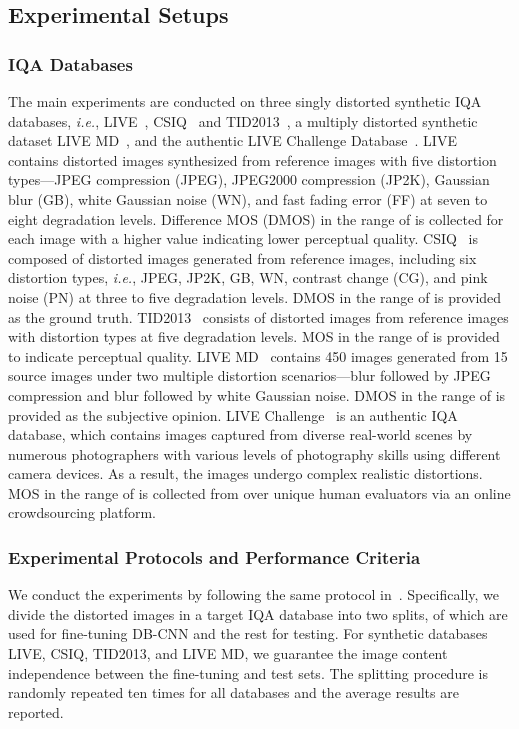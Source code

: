 \documentclass[journal]{IEEEtran}
\begin{document}
\subsection{Experimental Setups}\label{subsec:expsetup}
\subsubsection{IQA Databases}\label{subsec:IQAdatabase}
The main experiments are conducted on three singly distorted synthetic IQA databases, \textit{i.e.}, LIVE~\cite{sheikh2006statistical}, CSIQ~\cite{larson2010most} and TID2013~\cite{ponomarenko2013color}, a multiply distorted synthetic dataset LIVE MD~\cite{Jayaraman2013Objective}, and the authentic LIVE Challenge Database~\cite{ghadiyaram2016massive}. LIVE~\cite{sheikh2006statistical} contains  distorted images synthesized from  reference images with five distortion types---JPEG compression (JPEG), JPEG2000 compression (JP2K), Gaussian blur (GB), white Gaussian noise (WN), and fast fading error (FF) at seven to eight degradation levels. Difference MOS (DMOS) in the range of  is collected for each image with a higher value indicating lower perceptual quality. CSIQ~\cite{larson2010most}  is composed of  distorted images generated from  reference images, including six distortion types, \textit{i.e.}, JPEG, JP2K, GB, WN, contrast change (CG), and pink noise (PN) at three to five degradation levels. DMOS in the range of  is provided as the ground truth. TID2013~\cite{ponomarenko2013color} consists of  distorted images from  reference images with  distortion types at five degradation levels. MOS in the range of  is provided to indicate perceptual quality. LIVE MD~\cite{Jayaraman2013Objective} contains 450 images generated from 15 source images under two multiple distortion scenarios---blur followed by JPEG compression and blur followed by white Gaussian noise. DMOS in the range of  is provided as the subjective opinion. LIVE Challenge~\cite{ghadiyaram2016massive} is an authentic IQA database, which contains  images captured from diverse real-world scenes by numerous photographers with various levels of photography skills using different camera devices. As a result, the images undergo complex realistic distortions. MOS in the range of  is collected from over  unique human evaluators via an online crowdsourcing platform.

\subsubsection{Experimental Protocols and Performance Criteria}\label{subsec:expprotocol}
We conduct the experiments by following the same protocol in~\cite{kim2017deep}. Specifically, we divide the distorted images in a target IQA database into two splits,  of which are used for fine-tuning  DB-CNN and the rest  for testing. For synthetic databases LIVE, CSIQ, TID2013, and LIVE MD, we guarantee the image content independence between the fine-tuning and test sets. The splitting procedure is randomly repeated ten times for all databases and the average results are reported.
\end{document}
